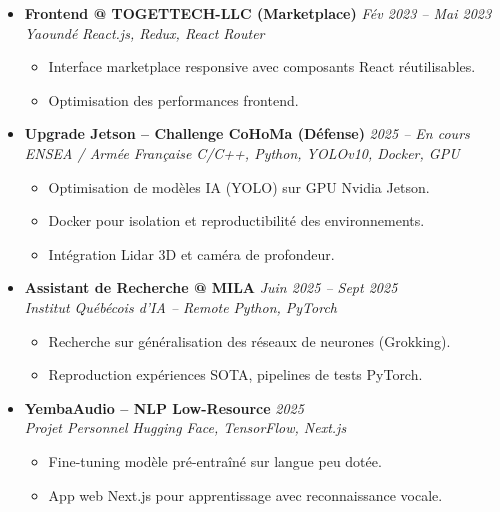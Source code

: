 \documentclass[a4paper,11pt]{article}
\begin{document}
\begin{itemize}[leftmargin=*, label={-}]
\item \textbf{Frontend @ TOGETTECH-LLC (Marketplace)} \hfill \textit{Fév 2023 -- Mai 2023} \\
\textit{Yaoundé} \hfill \textit{React.js, Redux, React Router}
\vspace{-2pt}
    \begin{itemize}[leftmargin=0.4cm, nosep, label=\tiny$\bullet$]
        \item \small{Interface marketplace responsive avec composants React réutilisables.}
        \item \small{Optimisation des performances frontend.}
    \end{itemize}
\vspace{3pt}

\item \textbf{Upgrade Jetson -- Challenge CoHoMa (Défense)} \hfill \textit{2025 -- En cours} \\
\textit{ENSEA / Armée Française} \hfill \textit{C/C++, Python, YOLOv10, Docker, GPU}
\vspace{-2pt}
    \begin{itemize}[leftmargin=0.4cm, nosep, label=\tiny$\bullet$]
        \item \small{Optimisation de modèles IA (YOLO) sur GPU Nvidia Jetson.}
        \item \small{Docker pour isolation et reproductibilité des environnements.}
        \item \small{Intégration Lidar 3D et caméra de profondeur.}
    \end{itemize}
\vspace{3pt}

\item \textbf{Assistant de Recherche @ MILA} \hfill \textit{Juin 2025 -- Sept 2025} \\
\textit{Institut Québécois d'IA -- Remote} \hfill \textit{Python, PyTorch}
\vspace{-2pt}
    \begin{itemize}[leftmargin=0.4cm, nosep, label=\tiny$\bullet$]
        \item \small{Recherche sur généralisation des réseaux de neurones (Grokking).}
        \item \small{Reproduction expériences SOTA, pipelines de tests PyTorch.}
    \end{itemize}
\vspace{3pt}

\item \textbf{YembaAudio -- NLP Low-Resource} \hfill \textit{2025} \\
\textit{Projet Personnel} \hfill \textit{Hugging Face, TensorFlow, Next.js}
\vspace{-2pt}
    \begin{itemize}[leftmargin=0.4cm, nosep, label=\tiny$\bullet$]
        \item \small{Fine-tuning modèle pré-entraîné sur langue peu dotée.}
        \item \small{App web Next.js pour apprentissage avec reconnaissance vocale.}
    \end{itemize}
\vspace{3pt}


\end{itemize}
\end{document}
